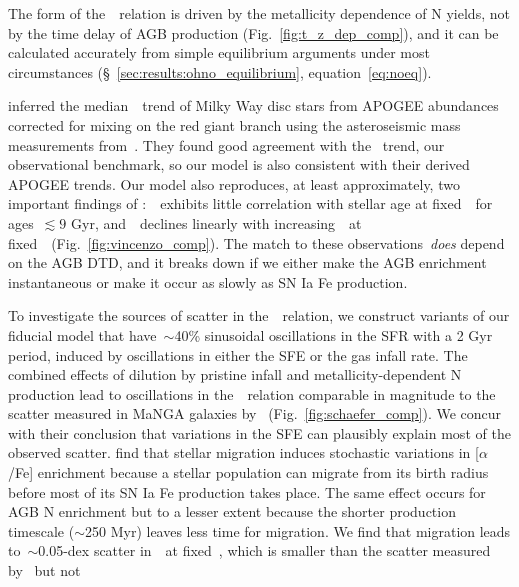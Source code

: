 \documentclass[ms.tex]{subfiles}
\begin{document}
The form of the~\ohno~relation is driven by the metallicity dependence of N
yields, not by the time delay of AGB production (Fig.~\ref{fig:t_z_dep_comp}),
and it can be calculated accurately from simple equilibrium arguments under
most circumstances (\S~\ref{sec:results:ohno_equilibrium},
equation~\ref{eq:noeq}).
\par
\citet{Vincenzo2021} inferred the median~\ohno~trend of Milky Way disc stars
from APOGEE abundances corrected for mixing on the red giant branch using the
asteroseismic mass measurements from~\citet{Miglio2021}.
They found good agreement with the~\citet{Dopita2016} trend, our observational
benchmark, so our model is also consistent with their derived APOGEE trends.
Our model also reproduces, at least approximately, two important findings of
\citet{Vincenzo2021}:~\no~exhibits little correlation with stellar age at
fixed~\feh~for ages~$\lesssim 9$ Gyr, and~\no~declines linearly with
increasing~\ofe~at fixed~\oh~(Fig.~\ref{fig:vincenzo_comp}).
The match to these observations~\textit{does} depend on the AGB DTD, and it
breaks down if we either make the AGB enrichment instantaneous or make it occur
as slowly as SN Ia Fe production.
\par
To investigate the sources of scatter in the~\ohno~relation, we construct
variants of our fiducial model that have~$\sim$40\% sinusoidal oscillations in
the SFR with a 2 Gyr period, induced by oscillations in either the SFE or the
gas infall rate.
The combined effects of dilution by pristine infall and metallicity-dependent N
production lead to oscillations in the~\ohno~relation comparable in magnitude
to the scatter measured in MaNGA galaxies by~\citet{Schaefer2020}
(Fig.~\ref{fig:schaefer_comp}).
We concur with their conclusion that variations in the SFE can plausibly
explain most of the observed scatter.
\citet{Johnson2021} find that stellar migration induces stochastic variations
in [$\alpha$/Fe] enrichment because a stellar population can migrate from its
birth radius before most of its SN Ia Fe production takes place.
The same effect occurs for AGB N enrichment but to a lesser extent because the
shorter production timescale ($\sim$250 Myr) leaves less time for migration.
We find that migration leads to~$\sim$0.05-dex scatter in~\no~at fixed~\oh,
which is smaller than the scatter measured by~\citet{Schaefer2020} but not
\end{document}
